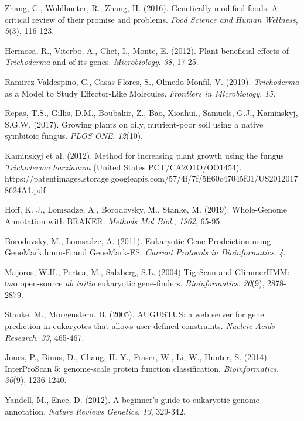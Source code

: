 \documentclass[12pt]{article}
\begin{document}
\begin{thebibliography}{99}
 Zhang, C., Wohlhueter, R., Zhang, H. (2016). Genetically
  modified foods: A critical review of their promise and
  problems. \textit{Food Science and Human Wellness}, \textit{5}(3),
  116-123.

 Hermosa, R., Viterbo, A., Chet, I., Monte,
  E. (2012). Plant-beneficial effects of \textit{Trichoderma} and of
  its genes. \textit{Microbiology}. \textit{38},
  17-25. 

 Ramirez-Valdespino, C., Casas-Flores, S.,
  Olmedo-Monfil, V. (2019). \textit{Trichoderma} as a Model to Study
  Effector-Like Molecules. \textit{Frontiers in Microbiology}, \textit{15}.

 Repas, T.S., Gillis, D.M., Boubakir, Z., Bao,
  Xioahui., Samuels, G.J., Kaminskyj, S.G.W. (2017). Growing plants on
  oily, nutrient-poor soil using a native symbitoic
  fungus. \textit{PLOS ONE}, \textit{12}(10).

 Kaminskyj et al. (2012). Method for increasing
  plant growth using the fungus \textit{Trichoderma harzianum} (United
  States PCT/CA2O1O/OO1454). https://patentimages.storage.googleapis.com/57/4f/7f/5ff60c47045f01/US20120178624A1.pdf
  
 Hoff, K. J., Lomsadze, A., Borodovsky, M., Stanke,
  M. (2019). Whole-Genome Annotation with BRAKER. \textit{Methods Mol
    Biol.}, \textit{1962}, 65-95.

 Borodovsky, M., Lomsadze, A. (2011). Eukaryotic
  Gene Prodeiction using GeneMark.hmm-E and
  GeneMark-ES. \textit{Current Protocols in
    Bioinformatics}. \textit{4}.

 Majoros, W.H., Pertea, M., Salzberg, S.L. (2004) TigrScan and
  GlimmerHMM: two open-source \textit{ab initio} eukaryotic
  gene-finders. \textit{Bioinformatics}. \textit{20}(9), 2878-2879.
  
 Stanke, M., Morgenstern, B. (2005). AUGUSTUS: a web
  server for gene prediction in eukaryotes that allows user-defined
  constraints. \textit{Nucleic Acids Research}. \textit{33}, 465-467.
  
 Jones, P., Binns, D., Chang, H. Y., Fraser,
  W., Li, W., Hunter, S. (2014). InterProScan 5: genome-scale
  protein function
  classification. \textit{Bioinformatics}. \textit{30}(9),
  1236-1240.

 Yandell, M., Ence, D. (2012). A beginner's
  guide to eukaryotic genome annotation. \textit{Nature Reviews
    Genetics}. \textit{13}, 329-342.
  

\end{thebibliography}
\end{document}
